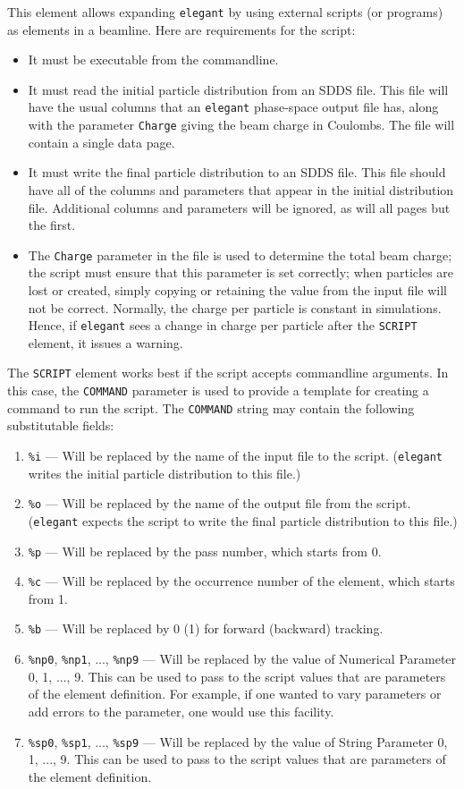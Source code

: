This element allows expanding {\tt elegant} by using external scripts
(or programs) as elements in a beamline.    Here are requirements for the 
script:
\begin{itemize}
\item It must be executable from the commandline.
\item It must read the initial particle distribution from an SDDS file.
This file will have the usual columns that an {\tt elegant} phase-space
output file  has, along with the parameter {\tt Charge} giving the 
beam charge in Coulombs. The file will contain a single data page.
\item It must write the final particle distribution to an SDDS file.
This file should have all of the columns and parameters that appear in the
initial distribution file.  Additional columns and parameters will be ignored,
as will all pages but the first. 
\item The {\tt Charge} parameter in the file is used to determine the total beam charge; the script must ensure that
  this parameter is set correctly; when particles are lost or created, simply copying or retaining the value from the
  input file will not be correct. Normally, the charge per particle is constant in simulations. Hence, if {\tt elegant}
  sees a change in charge per particle after the {\tt SCRIPT} element, it issues a warning.
\end{itemize}

The {\tt SCRIPT} element works best if the script accepts commandline
arguments.  In this case, the {\tt COMMAND} parameter is used to
provide a template for creating a command to run the script.  The {\tt COMMAND}
string may contain the following substitutable fields:
\begin{enumerate}
\item \verb|%i| --- Will be replaced by the name of the input file to the script.
({\tt elegant} writes the initial particle distribution to this file.)
\item \verb|%o| --- Will be replaced by the name of the output file from the script.
({\tt elegant} expects the script to write the final particle distribution to this file.)
\item \verb|%p| --- Will be replaced by the pass number, which starts from 0.
\item \verb|%c| --- Will be replaced by the occurrence number of the element, which starts from 1.
\item \verb|%b| --- Will be replaced by 0 (1) for forward (backward) tracking.
\item \verb|%np0|, \verb|%np1|, ..., \verb|%np9| --- Will be replaced by the value of
 Numerical Parameter 0, 1, ..., 9.  This can be used to pass to the script values that
 are parameters of the element definition.  For example, if one wanted to vary parameters 
 or add errors to the parameter, one would use this facility.
\item \verb|%sp0|,  \verb|%sp1|, ..., \verb|%sp9| --- Will be replaced by the value of
 String Parameter 0, 1, ..., 9.  This can be used to pass to the script values that
 are parameters of the element definition. 
\end{enumerate}

